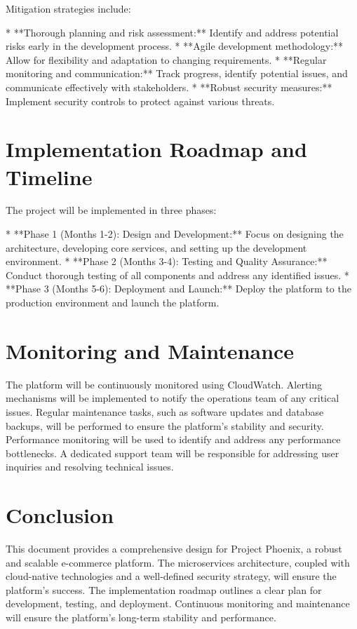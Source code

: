 \documentclass[11pt,a4paper,oneside]{article}
\begin{document}
Mitigation strategies include:

* **Thorough planning and risk assessment:**  Identify and address potential risks early in the development process.
* **Agile development methodology:**  Allow for flexibility and adaptation to changing requirements.
* **Regular monitoring and communication:**  Track progress, identify potential issues, and communicate effectively with stakeholders.
* **Robust security measures:**  Implement security controls to protect against various threats.

\section{Implementation Roadmap and Timeline}

The project will be implemented in three phases:

* **Phase 1 (Months 1-2): Design and Development:**  Focus on designing the architecture, developing core services, and setting up the development environment.
* **Phase 2 (Months 3-4): Testing and Quality Assurance:**  Conduct thorough testing of all components and address any identified issues.
* **Phase 3 (Months 5-6): Deployment and Launch:**  Deploy the platform to the production environment and launch the platform.

\section{Monitoring and Maintenance}

The platform will be continuously monitored using CloudWatch.  Alerting mechanisms will be implemented to notify the operations team of any critical issues.  Regular maintenance tasks, such as software updates and database backups, will be performed to ensure the platform's stability and security.  Performance monitoring will be used to identify and address any performance bottlenecks.  A dedicated support team will be responsible for addressing user inquiries and resolving technical issues.

\section{Conclusion}

This document provides a comprehensive design for Project Phoenix, a robust and scalable e-commerce platform.  The microservices architecture, coupled with cloud-native technologies and a well-defined security strategy, will ensure the platform's success.  The implementation roadmap outlines a clear plan for development, testing, and deployment.  Continuous monitoring and maintenance will ensure the platform's long-term stability and performance.
\end{document}

